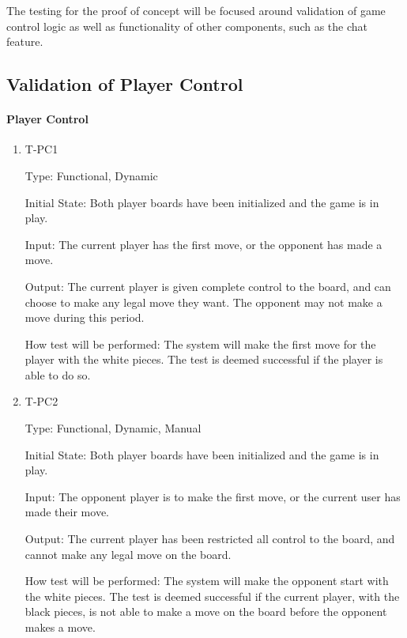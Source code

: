 \documentclass[12pt, titlepage]{article}
\begin{document}
The testing for the proof of concept will be focused around validation of game control logic as well as functionality of other components, such as the chat feature.

\subsection{Validation of Player Control}
    \paragraph{Player Control}
        \begin{enumerate}
        
            \item{T-PC1\\}
            
                Type: Functional, Dynamic
                					
                Initial State: Both player boards have been initialized and the game is in play.
                					
                Input: The current player has the first move, or the opponent has made a move.
                					
                Output: The current player is given complete control to the board, and can choose to make any legal move they want. The opponent may not make a move during this period.
                					
                How test will be performed: The system will make the first move for the player with the white pieces. The test is deemed successful if the player is able to do so.

            \item{T-PC2\\}
            
                Type: Functional, Dynamic, Manual
                					
                Initial State: Both player boards have been initialized and the game is in play.
                					
                Input: The opponent player is to make the first move, or the current user has made their move.
                					
                Output: The current player has been restricted all control to the board, and cannot make any legal move on the board.
                					
                How test will be performed: The system will make the opponent start with the white pieces. The test is deemed successful if the current player, with the black pieces, is not able to make a move on the board before the opponent makes a move.

        \end{enumerate}
\end{document}
